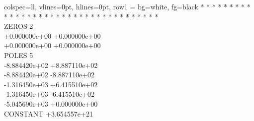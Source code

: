 \begin{table}[H]
\begin{tblr}{
        colspec={ll},
        vlines=0pt,
        hlines=0pt,
        row{1} = {bg=white, fg=black}
    }
    \ttfamily * * * * * * * * * * * * * * * * * * * * * * * * * * * * * * * * * * * * * \\
    \ttfamily ZEROS 2 \\
    \ttfamily +0.000000e+00 +0.000000e+00 \\
    \ttfamily +0.000000e+00 +0.000000e+00 \\
    \ttfamily POLES 5 \\
    \ttfamily -8.884420e+02 +8.887110e+02 \\
    \ttfamily -8.884420e+02 -8.887110e+02 \\
    \ttfamily -1.316450e+03 +6.415510e+02 \\
    \ttfamily -1.316450e+03 -6.415510e+02 \\
    \ttfamily -5.045690e+03 +0.000000e+00 \\
    \ttfamily CONSTANT 	+3.654557e+21 \\
    \end{tblr}
\end{table}
